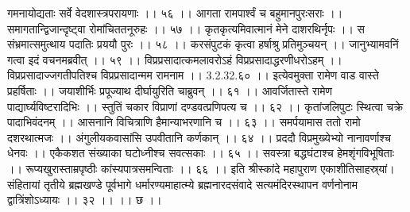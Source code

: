 गमनायोद्यताः सर्वे वेदशास्त्रपरायणाः ।। ५६ ।।
आगता रामपार्श्वं च बहुमानपुरःसराः ।।
समागतान्द्विजान्दृष्ट्वा रोमांचिततनूरुहः ।। ५७ ।।
कृतकृत्यमिवात्मानं मेने दाशरथिर्नृपः ।।
स संभ्रमात्समुत्थाय पदातिः प्रययौ पुरः ।। ५८ ।।
करसंपुटकं कृत्वा हर्षाश्रु प्रतिमुञ्चयन् ।।
जानुभ्यामवनिं गत्वा इदं वचनमब्रवीत् ।। ५९ ।।
विप्रप्रसादात्कमलावरोऽहं विप्रप्रसादाद्धरणीधरोऽहम् ।।
विप्रप्रसादाज्जगतीपतिश्च विप्रप्रसादान्मम रामनाम ।। 3.2.32.६० ।।
इत्येवमुक्ता रामेण वाड वास्ते प्रहर्षिताः ।।
जयाशीर्भिः प्रपूज्याथ दीर्घायुरिति चाब्रुवन् ।। ६१ ।।
आवर्जितास्ते रामेण पाद्यार्घ्यविष्टरादिभिः ।।
स्तुतिं चकार विप्राणां दण्डवत्प्रणिपत्य च ।। ६२ ।।
कृतांजलिपुटः स्थित्वा चक्रे पादाभिवंदनम् ।।
आसनानि विचित्राणि हैमान्याभरणानि च ।। ६३ ।।
समर्पयामास ततो रामो दशरथात्मजः ।।
अंगुलीयकवासांसि उपवीतानि कर्णकान् ।। ६४ ।।
प्रददौ विप्रमुख्येभ्यो नानावर्णाश्च धेनवः ।।
एकैकशत संख्याका घटोध्नीश्च सवत्सकाः ।। ६५ ।।
सवस्त्रा बद्धघंटाश्च हेमशृंगविभूषिताः ।।
रूप्यखुरास्ताम्रपृष्ठीः कांस्यपात्रसमन्विताः ।। ६६ ।।
इति श्रीस्कांदे महापुराण एकाशीतिसाहस्र्यां। संहितायां तृतीये ब्रह्मखण्डे पूर्वभागे धर्मारण्यमाहात्म्ये ब्रह्मनारदसंवादे सत्यमंदिरस्थापन वर्णनोनाम द्वात्रिंशोऽध्यायः ।। ३२ ।। ।। छ ।।


